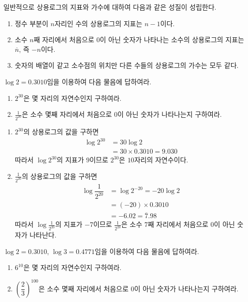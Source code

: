 \documentclass[11pt, a4paper]{book}
\begin{document}
일반적으로 상용로그의 지표와 가수에 대하여 다음과 같은 성질이 성립한다.
\begin{theorem}
\begin{enumerate}[label=(\arabic*)]
	\item 정수 부분이 $n$자리인 수의 상용로그의 지표는 $n-1$이다.
	\item 소수 $n$째 자리에서 처음으로 $0$이 아닌 숫자가 나타나는 소수의 상용로그의 지표는 $\overline{n}$, 즉 $-n$이다.
	\item 숫자의 배열이 같고 소수점의 위치만 다른 수들의 상용로그의 가수는 모두 같다.
\end{enumerate}

\end{theorem}
\begin{example}
	$\log 2=0.3010$임을 이용하여 다음 물음에 답하여라.
\begin{enumerate}[label=(\arabic*)]
	\item $2^{30}$은 몇 자리의 자연수인지 구하여라.
	\item $\frac{1}{2^{20}}$은 소수 몇째 자리에서 처음으로 $0$이 아닌 숫자가 나타나는지 구하여라.
\end{enumerate}
\begin{solution}
	\begin{enumerate}[label=(\arabic*)]
		\item $2^{30}$의 상용로그의 값을 구하면
		 \begin{align*}
		 	\log 2^{30}&=30\log 2\\
		 		 	&=30\times 0.3010=9.030
		 \end{align*}
		따라서 $\log 2^{30}$의 지표가 $9$이므로 $2^{30}$은 $10$자리의 자연수이다.
		\item $\frac{1}{2^{20}}$의 상용로그의 값을 구하면
		\begin{align*}
			\log\dfrac{1}{2^{20}}&=\log 2^{-20}= -20\log 2\\
						                       &=(-20)\times 0.3010\\
			                     			    &= -6.02 =\overline{7}.98
		\end{align*}
	따라서 $\log\frac{1}{2^{20}}$의 지표가 $-7$이므로 $\frac{1}{2^{20}}$은 소수 $7$째 자리에서 처음으로 $0$이 아닌 숫자가 나타난다.
	\end{enumerate}
\end{solution}
\end{example}

\begin{problem}
$\log 2=0.3010$, $\log 3=0.4771$임을 이용하여 다음 물음에 답하여라.
\begin{enumerate}[label=(\arabic*)]
	\item $6^{10}$은 몇 자리의 자연수인지 구하여라.
	\item $\left(\dfrac{2}{3}\right)^{100}$은 소수 몇째 자리에서 처음으로 $0$이 아닌 숫자가 나타나는지 구하여라.
\end{enumerate}
\end{problem}
\end{document}
